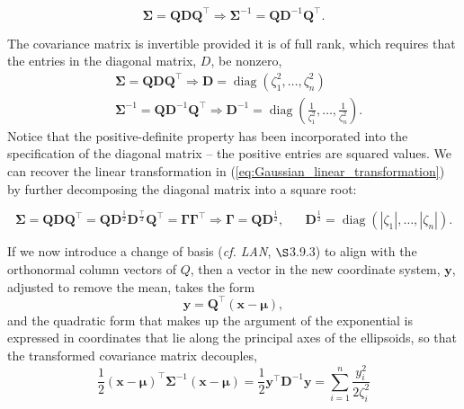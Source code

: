 \documentclass[12pt, twoside, draft]{article}
\begin{document}
\begin{equation}
\boldsymbol{\Sigma} = \mathbf{Q} \mathbf{D} \mathbf{Q}^\top \Rightarrow \boldsymbol{\Sigma}^{-1} = \mathbf{Q} \mathbf{D}^{-1} \mathbf{Q}^\top.
\end{equation}

The covariance matrix is invertible provided it is of full rank, which requires that the entries in the diagonal matrix, $D$, be nonzero,
\begin{align}
&\boldsymbol{\Sigma} = \mathbf{Q} \mathbf{D} \mathbf{Q}^\top \Rightarrow\mathbf{D} = \operatorname{diag}(\zeta_1^2, \ldots, \zeta_n^2) \\
&\boldsymbol{\Sigma}^{-1} = \mathbf{Q} \mathbf{D}^{-1} \mathbf{Q}^\top \Rightarrow \mathbf{D}^{-1} = \operatorname{diag}\left( \frac{1}{\zeta_1^2}, \ldots, \frac{1}{\zeta_n^2} \right).
\end{align}
Notice that the positive-definite property has been incorporated into the specification of the diagonal matrix -- the positive entries are squared values.  We can recover the linear transformation in (\ref{eq:Gaussian_linear_transformation}) by further decomposing the diagonal matrix into a square root:

\begin{equation}
\boldsymbol{\Sigma} = \mathbf{Q} \mathbf{D} \mathbf{Q}^\top = \mathbf{Q} \mathbf{D}^\frac{1}{2} \mathbf{D}^\frac{\top}{2} \mathbf{Q}^\top =\boldsymbol{\Gamma} \boldsymbol{\Gamma}^\top \Rightarrow \boldsymbol{\Gamma} = \mathbf{Q} \mathbf{D}^{\frac{1}{2}}, \hspace{20pt} \mathbf{D}^{\frac{1}{2}} = \operatorname{diag}(|\zeta_1|, \ldots, |\zeta_n|).
\end{equation}

If we now introduce a change of basis (\textit{cf. LAN}, $\S$3.9.3) to align with the orthonormal column vectors of $Q$, then a vector in the new coordinate system, $\mathbf{y}$, adjusted to remove the mean, takes the form
\begin{equation}
\mathbf{y} = \mathbf{Q}^\top(\mathbf{x} -\boldsymbol{\mu}),
\end{equation}
and the quadratic form that makes up the argument of the exponential is expressed in coordinates that lie along the principal axes of the ellipsoids, so that the transformed covariance matrix decouples,
\begin{equation}
\frac{1}{2}(\mathbf{x} - \boldsymbol{\mu})^\top \boldsymbol{\Sigma}^{-1}(\mathbf{x} - \boldsymbol{\mu}) = \frac{1}{2} \mathbf{y}^\top \mathbf{D}^{-1} \mathbf{y} = \sum_{i=1}^n \frac{y_i^2}{2\zeta_i^2}
\end{equation}
\end{document}
